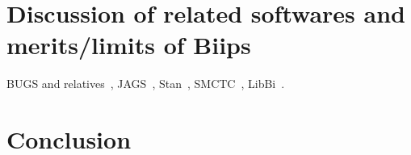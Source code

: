 \documentclass[article,shortnames]{jss}
\begin{document}
\section{Discussion of related softwares and merits/limits of Biips}
\label{sec:discussion}
BUGS and relatives~\citep{Lunn2000,Lunn2012}, JAGS~\citep{Plummer2003}, Stan~\citep{Stan2013}, SMCTC~\citep{Johansen2009}, LibBi~\citep{Murray2013}.

\section{Conclusion}
\label{sec:conclusion}




\end{document}
